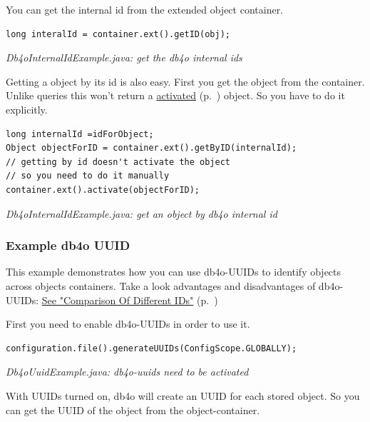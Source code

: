 You can get the internal id from the extended object container.

\begin{lstlisting}
long interalId = container.ext().getID(obj);
\end{lstlisting}

{\small\itshape Db4oInternalIdExample.java: get the db4o internal ids\par}
\medskip

Getting a object by its id is also easy. First you get the object from the container. Unlike queries this won't return a \hyperref[ref:basics-activation]{activated} (p.~\pageref{ref:basics-activation}) object. So you have to do it explicitly.

\begin{lstlisting}
long internalId =idForObject;
Object objectForID = container.ext().getByID(internalId);
// getting by id doesn't activate the object
// so you need to do it manually
container.ext().activate(objectForID);
\end{lstlisting}

{\small\itshape Db4oInternalIdExample.java: get an object by db4o internal id\par}
\medskip

\subsubsection{Example db4o UUID}
\label{ref:platform-specific-issues-disconnected-objects-example-db4o-uuid}

This example demonstrates how you can use db4o-UUIDs to identify objects across objects containers. Take a look advantages and disadvantages of db4o-UUIDs: \hyperref[ref:platform-specific-issues-disconnected-objects-comparison-of-ids]{See "Comparison Of Different IDs"} (p.~\pageref{ref:platform-specific-issues-disconnected-objects-comparison-of-ids})

First you need to enable db4o-UUIDs in order to use it.

\begin{lstlisting}
configuration.file().generateUUIDs(ConfigScope.GLOBALLY);
\end{lstlisting}

{\small\itshape Db4oUuidExample.java: db4o-uuids need to be activated\par}
\medskip

With UUIDs turned on, db4o will create an UUID for each stored object. So you can get the UUID of the object from the object-container.

